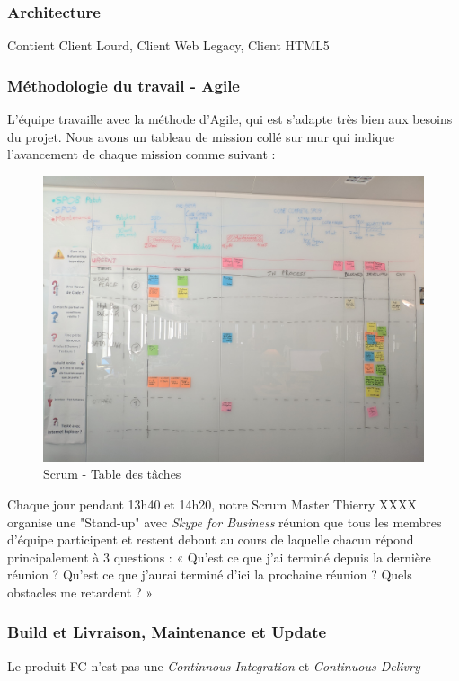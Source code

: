 \documentclass[12pt]{article}
\begin{document}
    \subsubsection{Architecture}
    Contient Client Lourd, Client Web Legacy, Client HTML5
    
    \subsubsection{Méthodologie du travail - Agile}\par
    L'équipe travaille avec la méthode d'Agile, qui est s'adapte très bien aux besoins du projet. Nous avons un tableau de mission collé sur mur qui indique l'avancement de chaque mission comme suivant : 
    \begin{figure}[H]
        \centering
        \includegraphics[width=\textwidth]{scrum_tachTable.jpg}
        \caption{Scrum - Table des tâches}
        \label{fig:scrum_figure}
    \end{figure}
    \par Chaque jour pendant 13h40 et 14h20, notre Scrum Master Thierry XXXX organise une "Stand-up" avec \textit{Skype for Business} réunion que tous les membres d'équipe participent et restent debout au cours de laquelle chacun répond principalement à 3 questions : « Qu'est ce que j'ai terminé depuis la dernière réunion ? Qu'est ce que j'aurai terminé d'ici la prochaine réunion ? Quels obstacles me retardent ? »
    
    \subsubsection{Build et Livraison, Maintenance et Update}
    Le produit FC n'est pas une \textit{Continnous  Integration} et \textit{Continuous Delivry}
    
\end{document}
